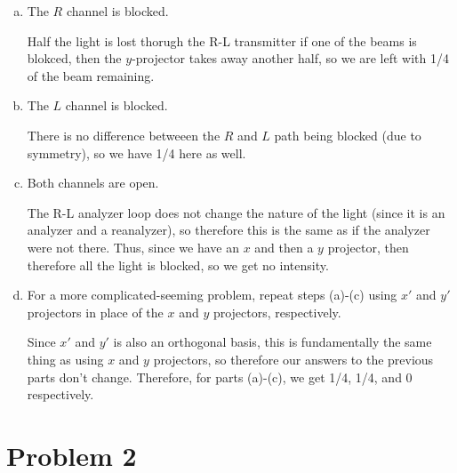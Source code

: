\documentclass[10pt]{article}
\begin{document}
    \begin{enumerate}[(a)]
        \item The $R$ channel is blocked.
        
        \begin{solution}
            Half the light is lost thorugh the R-L transmitter if one of the beams is blokced, then the $y$-projector takes away another half, so we are left with 1/4 of the beam remaining.
        \end{solution}
        \item The $L$ channel is blocked. 
        
        \begin{solution}
            There is no difference betweeen the $R$ and $L$ path being blocked (due to symmetry), so we have 1/4 here as well.
        \end{solution}
        \item Both channels are open.
        
        \begin{solution}
            The R-L analyzer loop does not change the nature of the light (since it is an analyzer and a reanalyzer), so therefore this is the same as if the analyzer were not there. Thus, since we have an $x$ and then a $y$ projector, then therefore all the light is blocked, so we get no intensity.
        \end{solution}
        \item For a more complicated-seeming problem, repeat steps (a)-(c) using $x'$ and $y'$ projectors in place of the $x$ and $y$ projectors, respectively.
        
        \begin{solution}
            Since $x'$ and $y'$ is also an orthogonal basis, this is fundamentally the same thing as using $x$ and $y$ projectors, so therefore our answers to the previous parts don't change. Therefore, for parts (a)-(c), we get 1/4, 1/4, and 0 respectively.
        \end{solution}
    \end{enumerate}


    \pagebreak

    \section*{Problem 2}
\end{document}

